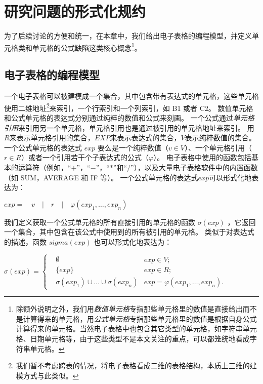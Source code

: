 \chapter{研究问题的形式化规约}

为了后续讨论的方便和统一，在本章中，我们给出电子表格的编程模型，并定义单元格类和单元格的公式缺陷这类核心概念\footnote{除额外说明之外，我们用\textit{数值单元格}专指那些单元格里的数值是直接给出而不是计算得来的单元格，用\textit{公式单元格}专指那些单元格里的数值是根据自身公式计算得来的单元格。当然电子表格中也包含其它类型的单元格，如字符串单元格、日期单元格等，由于这些类型不是本文关注的重点，可以都笼统地看成字符串单元格。}。


\section{电子表格的编程模型}
一个电子表格可以被建模成一个集合，其中包含带有表达式的单元格，这些单元格使用二维地址\footnote{我们暂不考虑跨表的情况，将电子表格看成二维的表格结构，本质上三维的建模方式与此类似。}来索引，一个行索引和一个列索引，如 B1 或者 C2。
数值单元格和公式单元格的表达式分别通过纯粹的数值和公式来刻画。
一个公式通过\textit{单元格引用}来引用另一个单元格，单元格引用也是通过被引用的单元格地址来索引。
用$R$来表示单元格引用的集合，$EXP$来表示表达式的集合，$V$表示纯粹数值的集合。
一个公式单元格的表达式 $exp$ 要么是一个纯粹数值（$v \in V$）、一个单元格引用（$r \in R$）或者一个引用若干个子表达式的公式（$\varphi $）。
电子表格中使用的函数包括基本的运算符（例如，“$+$”，“$-$”，“$*$”和“$/$”），以及大量电子表格软件中的内置函数（如 SUM，AVERAGE 和 IF 等）。
一个公式单元格的表达式$exp$可以形式化地表达为：
\begin{definition}
    $ exp =\quad v\quad |\quad r\quad |\quad \varphi (exp_1,\dots,exp_n) $
\end{definition}

我们定义获取一个公式单元格的所有直接引用的单元格的函数 $\sigma(exp)$ ，它返回一个集合，其中包含在该公式中使用到的所有被引用的单元格。
类似于对表达式的描述，函数 $sigma(exp)$ 也可以形式化地表达为：
\begin{definition}
$
\sigma(exp) = 
\left\{
    \begin{aligned}
       & \emptyset & exp \in V; \\
       & \{exp\}     & exp \in R; \\
       & \sigma(exp_1) \cup \dots \cup \sigma(exp_n) & exp = \varphi(exp_1, \dots , exp_n).
    \end{aligned}
\right.
$
\end{definition}

